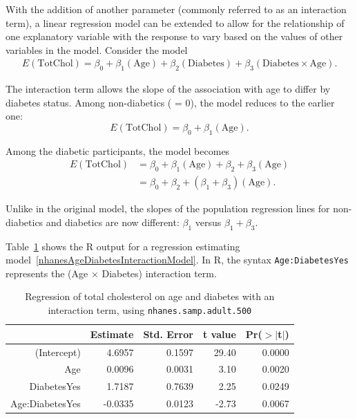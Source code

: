 With the addition of another parameter (commonly referred to as an interaction term), a linear regression model can be extended to allow for the relationship of one explanatory variable with the response to vary based on the values of other variables in the model. Consider the model
\begin{align}\label{nhanesAgeDiabetesInteractionModel}
E(\text{TotChol}) = \beta_0 + \beta_1(\text{Age}) + \beta_2(\text{Diabetes}) + 
\beta_3 (\text{Diabetes} \times \text{Age}). 
\end{align}

The interaction term allows the slope of the association with age to differ by diabetes status. Among non-diabetics ( = 0), the model reduces to the earlier one:
\[E(\text{TotChol}) = \beta_0 + \beta_1(\text{Age}). \]

Among the diabetic participants, the model becomes
\begin{align*}
  E(\text{TotChol}) &= \beta_0  + \beta_1(\text{Age}) + \beta_2 + 
       \beta_3 (\text{Age}) \\
       & = \beta_0 + \beta_2 + (\beta_1 + \beta_3)(\text{Age}).
\end{align*}

Unlike in the original model, the slopes of the population regression lines for non-diabetics and diabetics are now different: $\beta_1$ versus $\beta_1 + \beta_3$.

Table~\ref{nhanesAgeDiabetesInteraction} shows the \textsf{R} output for a regression estimating model~\ref{nhanesAgeDiabetesInteractionModel}. In \textsf{R}, the syntax \texttt{Age:DiabetesYes} represents the (Age $\times$ Diabetes) interaction term. 

\begin{table}[ht]
\centering
\begin{tabular}{rrrrr}
  \hline
 & Estimate & Std. Error & t value & Pr($>$$|$t$|$) \\ 
  \hline
(Intercept) & 4.6957 & 0.1597 & 29.40 & 0.0000 \\ 
  Age & 0.0096 & 0.0031 & 3.10 & 0.0020 \\ 
  DiabetesYes & 1.7187 & 0.7639 & 2.25 & 0.0249 \\ 
  Age:DiabetesYes & -0.0335 & 0.0123 & -2.73 & 0.0067 \\ 
   \hline
\end{tabular}
\caption{Regression of total cholesterol on age and diabetes with an interaction term, using \texttt{nhanes.samp.adult.500}} 
\label{nhanesAgeDiabetesInteraction}
\end{table}

